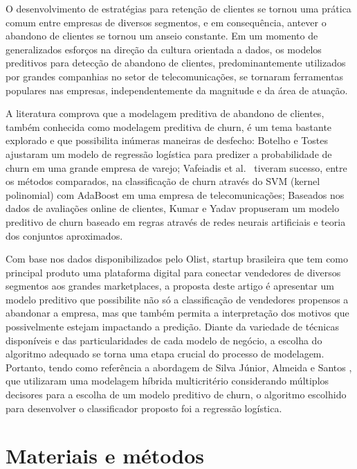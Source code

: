 \documentclass[twocolumn]{rbef}
\newcommand{\1}{\mathbbm{1}}
\begin{document}
O desenvolvimento de estratégias para retenção de clientes se tornou uma prática comum entre empresas de diversos segmentos, e em consequência, antever o abandono de clientes se tornou um anseio constante. Em um momento de generalizados esforços na direção da cultura orientada a dados, os modelos preditivos para detecção de abandono de clientes, predominantemente utilizados por grandes companhias no setor de telecomunicações, se tornaram ferramentas populares nas empresas, independentemente da magnitude e da área de atuação.

A literatura comprova que a modelagem preditiva de abandono de clientes, também conhecida como modelagem preditiva de churn, é um tema bastante explorado e que possibilita inúmeras maneiras de desfecho: Botelho e Tostes \cite{Botelho2010} ajustaram um modelo de regressão logística para predizer a probabilidade de churn em uma grande empresa de varejo; Vafeiadis et al.~\cite{Vafeiadis2015} tiveram sucesso, entre os métodos comparados, na classificação de churn através do SVM (kernel polinomial) com AdaBoost em uma empresa de telecomunicações; Baseados nos dados de avaliações online de clientes, Kumar e Yadav \cite{Kumar2020} propuseram um modelo preditivo de churn baseado em regras através de redes neurais artificiais e teoria dos conjuntos aproximados.

Com base nos dados disponibilizados pelo Olist, startup brasileira que tem como principal produto uma plataforma digital para conectar vendedores de diversos segmentos aos grandes marketplaces, a proposta deste artigo é apresentar um modelo preditivo que possibilite não só a classificação de vendedores propensos a abandonar a empresa, mas que também permita a interpretação dos motivos que possivelmente estejam impactando a predição. Diante da variedade de técnicas disponíveis e das particularidades de cada modelo de negócio, a escolha do algoritmo adequado se torna uma etapa crucial do processo de modelagem. Portanto, tendo como referência a abordagem de Silva Júnior, Almeida e Santos \cite{Junior2020}, que utilizaram uma modelagem híbrida multicritério considerando múltiplos decisores para a escolha de um modelo preditivo de churn, o algoritmo escolhido para desenvolver o classificador proposto foi a regressão logística.

\hypertarget{materiais-e-muxe9todos}{%
\section{Materiais e métodos}\label{materiais-e-muxe9todos}}
\end{document}
